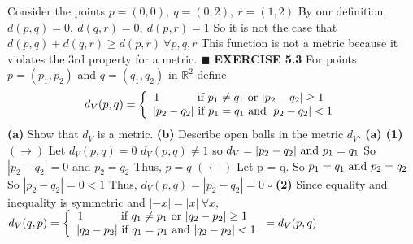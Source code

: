 \documentclass[12pt]{article}
\begin{document}
  \newline \newline
  Consider the points \(p = (0,0),\ q = (0,2),\ r = (1,2)\)
  \newline
  By our definition, \(d(p,q) = 0,\ d(q,r) = 0,\ d(p,r) = 1\)
  \newline \newline
  So it is not the case that \(d(p,q) + d(q,r) \geq d(p,r)\ \forall p,q,r\)
  \newline \newline
  This function is not a metric because it violates the 3rd property for a metric.
  \newline \(\blacksquare\)
  \newpage
  \noindent
  \textbf{EXERCISE 5.3} For points \(p = (p_1,p_2)\) and \(q = (q_1,q_2)\) in \(\mathbb{R}^2\) define
  \[d_V(p,q) = \left\{\begin{array}{ccc}1 \ \ \ \ \ \ \ \ \ \textup{ if } p_1 \neq q_1 \textup{ or } |p_2 - q_2|\geq 1\ \ \\ |p_2-q_2| \textup{ if } p_1 = q_1 \textup{ and } |p_2-q_2| < 1\end{array}\right.\]
  \newline
  \textbf{(a)} Show that \(d_V\) is a metric.
  \newline
  \textbf{(b)} Describe open balls in the metric \(d_V\).
  \newline \newline
  \textbf{(a) (1)} \((\rightarrow)\) Let \(d_V(p,q) = 0\)
  \newline
  \(d_V(p,q) \neq 1\) so \(d_V = |p_2-q_2| \textup{ and } p_1 = q_1\)
  \newline
  So \(|p_2-q_2| = 0\) and \(p_2 = q_2\)
  \newline
  Thus, \(p = q\)
  \newline \newline
  \((\leftarrow)\) Let p = q.
  \newline
  So \(p_1 = q_1 \textup{ and } p_2 = q_2\)
  \newline
  So \(|p_2 - q_2| = 0 < 1\)
  Thus, \(d_V(p,q) = |p_2 - q_2| = 0\)
  \newline \(\square\) \newline
  \textbf{(2)} Since equality and inequality is symmetric and \(|-x| = |x|\ \forall x\),
  \newline
  \(d_V(q,p) =  \left\{\begin{array}{ccc}1 \ \ \ \ \ \ \ \ \ \textup{ if } q_1 \neq p_1 \textup{ or } |q_2 - p_2|\geq 1\ \ \\  |q_2-p_2| \textup{ if } q_1 = p_1 \textup{ and } |q_2-p_2| < 1\end{array}\right. = d_V(p,q)\)
\end{document}
